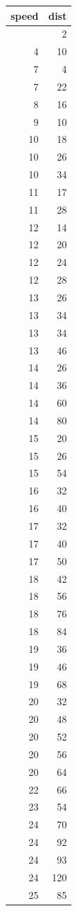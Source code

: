 \documentclass[
  letterpaper,
  DIV=11,
  numbers=noendperiod]{scrartcl}
\begin{document}
\begin{longtable}{rr}
\toprule
{\bfseries speed} & {\bfseries dist} \\ 
\midrule\endhead\addlinespace[2.5pt]
4 & 2 \\ 
4 & 10 \\ 
7 & 4 \\ 
7 & 22 \\ 
8 & 16 \\ 
9 & 10 \\ 
10 & 18 \\ 
10 & 26 \\ 
10 & 34 \\ 
11 & 17 \\ 
11 & 28 \\ 
12 & 14 \\ 
12 & 20 \\ 
12 & 24 \\ 
12 & 28 \\ 
13 & 26 \\ 
13 & 34 \\ 
13 & 34 \\ 
13 & 46 \\ 
14 & 26 \\ 
14 & 36 \\ 
14 & 60 \\ 
14 & 80 \\ 
15 & 20 \\ 
15 & 26 \\ 
15 & 54 \\ 
16 & 32 \\ 
16 & 40 \\ 
17 & 32 \\ 
17 & 40 \\ 
17 & 50 \\ 
18 & 42 \\ 
18 & 56 \\ 
18 & 76 \\ 
18 & 84 \\ 
19 & 36 \\ 
19 & 46 \\ 
19 & 68 \\ 
20 & 32 \\ 
20 & 48 \\ 
20 & 52 \\ 
20 & 56 \\ 
20 & 64 \\ 
22 & 66 \\ 
23 & 54 \\ 
24 & 70 \\ 
24 & 92 \\ 
24 & 93 \\ 
24 & 120 \\ 
25 & 85 \\ 
\bottomrule

\end{longtable}

\endgroup
\end{document}
